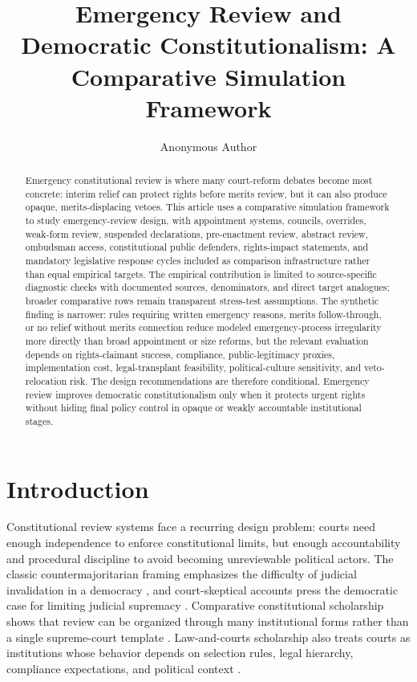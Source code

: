 \documentclass[
  journal=small,
  manuscript=research-article,
  year=2026
]{cup-journal}
\title{Emergency Review and Democratic Constitutionalism: A Comparative Simulation Framework}
\author{Anonymous Author}
\affiliation{Affiliation withheld for review}
\date{}
\begin{document}
\maketitle

\begin{abstract}
Emergency constitutional review is where many court-reform debates become most concrete: interim relief can protect rights before merits review, but it can also produce opaque, merits-displacing vetoes. This article uses a comparative simulation framework to study emergency-review design, with appointment systems, councils, overrides, weak-form review, suspended declarations, pre-enactment review, abstract review, ombudsman access, constitutional public defenders, rights-impact statements, and mandatory legislative response cycles included as comparison infrastructure rather than equal empirical targets. The empirical contribution is limited to source-specific diagnostic checks with documented sources, denominators, and direct target analogues; broader comparative rows remain transparent stress-test assumptions. The synthetic finding is narrower: rules requiring written emergency reasons, merits follow-through, or no relief without merits connection reduce modeled emergency-process irregularity more directly than broad appointment or size reforms, but the relevant evaluation depends on rights-claimant success, compliance, public-legitimacy proxies, implementation cost, legal-transplant feasibility, political-culture sensitivity, and veto-relocation risk. The design recommendations are therefore conditional. Emergency review improves democratic constitutionalism only when it protects urgent rights without hiding final policy control in opaque or weakly accountable institutional stages.
\end{abstract}

\section{Introduction}

Constitutional review systems face a recurring design problem: courts need enough independence to enforce constitutional limits, but enough accountability and procedural discipline to avoid becoming unreviewable political actors. The classic countermajoritarian framing emphasizes the difficulty of judicial invalidation in a democracy \citep{bickel1962}, and court-skeptical accounts press the democratic case for limiting judicial supremacy \citep{tushnet1999}. Comparative constitutional scholarship shows that review can be organized through many institutional forms rather than a single supreme-court template \citep{stoneSweet2000,ginsburg2003}. Law-and-courts scholarship also treats courts as institutions whose behavior depends on selection rules, legal hierarchy, compliance expectations, and political context \citep{epsteinKnight1998,helmke2005,vanberg2005,staton2010}.
\end{document}
